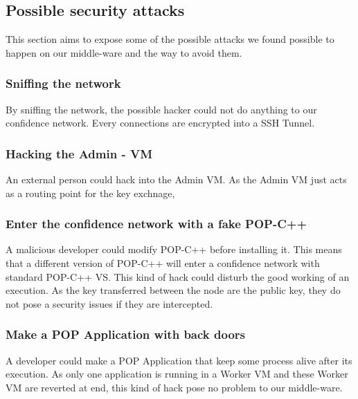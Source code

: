\subsection{Possible security attacks}
This section aims to expose some of the possible attacks we found possible to happen on our middle-ware and the way to avoid them. 

\subsubsection{Sniffing the network}
By sniffing the network, the possible hacker could not do anything to our confidence network. Every connections are encrypted into a SSH Tunnel. 

\subsubsection{Hacking the Admin - VM}
An external person could hack into the Admin VM. As the Admin VM just acts as a routing point for the key exchnage, 

\subsubsection{Enter the confidence network with a fake POP-C++}
A malicious developer could modify POP-C++ before installing it. This means that a different version of POP-C++ will enter a confidence network with standard POP-C++ VS. This kind of hack could disturb the good working of an execution. As the key transferred between the node are the public key, they do not pose a security issues if they are intercepted. 

\subsubsection{Make a POP Application with back doors}
A developer could make a POP Application that keep some process alive after its execution. As only one application is running in a Worker VM and these Worker VM are reverted at end, this kind of hack pose no problem to our middle-ware.

